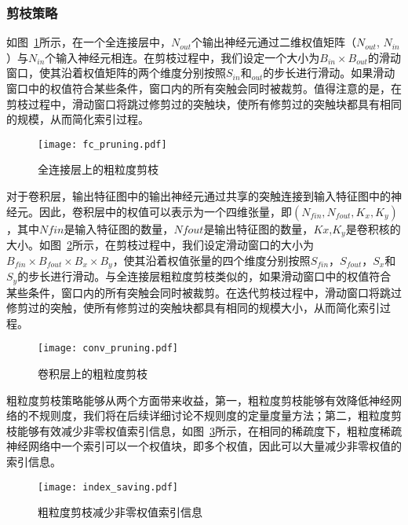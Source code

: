 \subsubsection{剪枝策略}

如图~\ref{fig:fc_pruning}所示，在一个全连接层中，$N_{out}$个输出神经元通过二维权值矩阵（$N_{out}$, $N_{in}$）与$N_{in}$个输入神经元相连。在剪枝过程中，我们设定一个大小为$B_{in} \times B_{out}$的滑动窗口，使其沿着权值矩阵的两个维度分别按照$S_{in}$和$_{out}$的步长进行滑动。如果滑动窗口中的权值符合某些条件，窗口内的所有突触会同时被裁剪。值得注意的是，在剪枝过程中，滑动窗口将跳过修剪过的突触块，使所有修剪过的突触块都具有相同的规模，从而简化索引过程。

\begin{figure}[h]
\centering
\texttt{[image: fc\_pruning.pdf]}
\caption{全连接层上的粗粒度剪枝}
\label{fig:fc_pruning}
\end{figure}


对于卷积层，输出特征图中的输出神经元通过共享的突触连接到输入特征图中的神经元。因此，卷积层中的权值可以表示为一个四维张量，即$(N_{fin},N_{fout},K_x,K_y)$，其中$N {fin}$是输入特征图的数量，$N {fout}$是输出特征图的数量，$K x$,$K_y$是卷积核的大小。如图~\ref{fig:conv_pruning}所示，在剪枝过程中，我们设定滑动窗口的大小为$B_{fin} \times B_{fout} \times B_x \times B_y$，使其沿着权值张量的四个维度分别按照$S_{fin}$，$S_{fout}$，$S_x$和$S_y$的步长进行滑动。与全连接层粗粒度剪枝类似的，如果滑动窗口中的权值符合某些条件，窗口内的所有突触会同时被裁剪。在迭代剪枝过程中，滑动窗口将跳过修剪过的突触，使所有修剪过的突触块都具有相同的规模大小，从而简化索引过程。

\begin{figure}[h]
  \centering
  \texttt{[image: conv\_pruning.pdf]}
  \caption{卷积层上的粗粒度剪枝}
  \label{fig:conv_pruning}
\end{figure}


粗粒度剪枝策略能够从两个方面带来收益，第一，粗粒度剪枝能够有效降低神经网络的不规则度，我们将在后续详细讨论不规则度的定量度量方法；第二，粗粒度剪枝能够有效减少非零权值索引信息，如图~\ref{fig:index_saving}所示，在相同的稀疏度下，粗粒度稀疏神经网络中一个索引可以一个权值块，即多个权值，因此可以大量减少非零权值的索引信息。

\begin{figure}[h]
  \centering
  \texttt{[image: index\_saving.pdf]}
  \caption{粗粒度剪枝减少非零权值索引信息}
  \label{fig:index_saving}
\end{figure}


